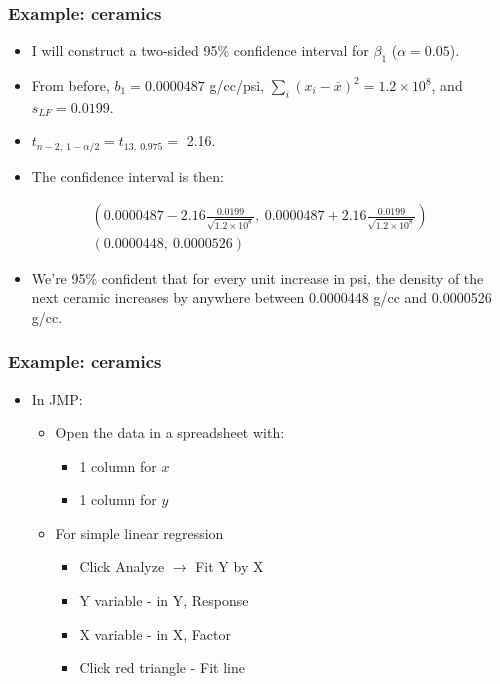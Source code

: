 \documentclass[handout]{beamer}\usepackage{graphicx, color}
\providecommand{\ov}[1]{\overline{#1}}
\numberwithin{equation}{section}
\begin{document}
\begin{frame}
\frametitle{Example: ceramics} \small
\begin{itemize}
\item I will construct a two-sided 95\% confidence interval for $\beta_1$ ($\alpha = 0.05$).
\pause \item From before, $b_1 = 0.0000487$ g/cc/psi, $\sum_i (x_i - \ov{x})^2 = 1.2 \times 10^8$, and $s_{LF} = 0.0199$.
\pause \item $t_{n -2, \ 1-\alpha/2} = t_{13, \ 0.975} = $ 2.16.
\pause \item The confidence interval is then:
\end{itemize}
\pause \begin{align*}
\left ( 0.0000487 - 2.16 \frac{0.0199}{\sqrt{1.2 \times 10^8}}, \ 0.0000487 + 2.16 \frac{0.0199}{\sqrt{1.2 \times 10^8}}  \right) \\
(0.0000448, \ 0.0000526)
\end{align*}
\begin{itemize}
\pause \item We're 95\% confident that for every unit increase in psi, the density of the next ceramic increases by anywhere between 0.0000448 g/cc and 0.0000526 g/cc.
\end{itemize}
\end{frame}

\begin{frame}
\frametitle{Example: ceramics}
\begin{itemize}
\item In JMP:
\begin{itemize}
\pause \item Open the data in a spreadsheet with:
\begin{itemize}
\pause \item 1 column for $x$
\pause \item 1 column for $y$
\end{itemize}
\pause \item For simple linear regression
\begin{itemize}
\pause \item Click Analyze $\rightarrow$ Fit Y by X
\pause \item Y variable - in Y, Response
\pause \item X variable - in X, Factor
\pause \item Click red triangle - Fit line
\end{itemize}
\end{itemize}
\end{itemize}
\end{frame}
\end{document}

